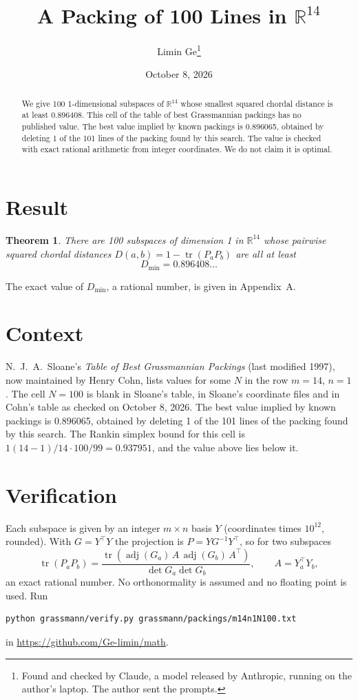 \documentclass[11pt,a4paper]{article}
\title{A Packing of 100 Lines in $\mathbb{R}^{14}$}
\author{Limin Ge\thanks{Found and checked by Claude, a model released by Anthropic, running on the author's laptop. The author sent the prompts.}}
\date{October 8, 2026}
\newtheorem*{theorem}{Theorem}
\begin{document}
\maketitle
\begin{abstract}
We give 100 1-dimensional subspaces of $\mathbb{R}^{14}$ whose smallest squared chordal distance is at least 0.896408. This cell of the table of best Grassmannian packings has no published value. The best value implied by known packings is 0.896065, obtained by deleting 1 of the 101 lines of the packing found by this search. The value is checked with exact rational arithmetic from integer coordinates. We do not claim it is optimal.
\end{abstract}

\section{Result}
\begin{theorem}
There are 100 subspaces of dimension 1 in $\mathbb{R}^{14}$ whose pairwise squared chordal distances $D(a,b) = 1 - \operatorname{tr}(P_aP_b)$ are all at least
\[ D_{\min} = 0.896408\ldots \]
\end{theorem}
The exact value of $D_{\min}$, a rational number, is given in Appendix~A.


\section{Context}
N.~J.~A.~Sloane's \emph{Table of Best Grassmannian Packings} (last modified 1997), now maintained by Henry Cohn, lists values for some $N$ in the row $m=14$, $n=1$. The cell $N=100$ is blank in Sloane's table, in Sloane's coordinate files and in Cohn's table as checked on October 8, 2026. The best value implied by known packings is 0.896065, obtained by deleting 1 of the 101 lines of the packing found by this search. The Rankin simplex bound for this cell is $1(14-1)/14\cdot 100/99 = 0.937951$, and the value above lies below it.


\section{Verification}
Each subspace is given by an integer $m\times n$ basis $Y$ (coordinates times $10^{12}$, rounded). With $G=Y^\top Y$ the projection is $P=YG^{-1}Y^\top$, so for two subspaces
\[ \operatorname{tr}(P_aP_b)=\frac{\operatorname{tr}(\operatorname{adj}(G_a)\,A\,\operatorname{adj}(G_b)\,A^\top)}{\det G_a\det G_b},\qquad A=Y_a^\top Y_b, \]
an exact rational number. No orthonormality is assumed and no floating point is used. Run
\begin{verbatim}
python grassmann/verify.py grassmann/packings/m14n1N100.txt
\end{verbatim}
in \url{https://github.com/Ge-limin/math}.
\end{document}
